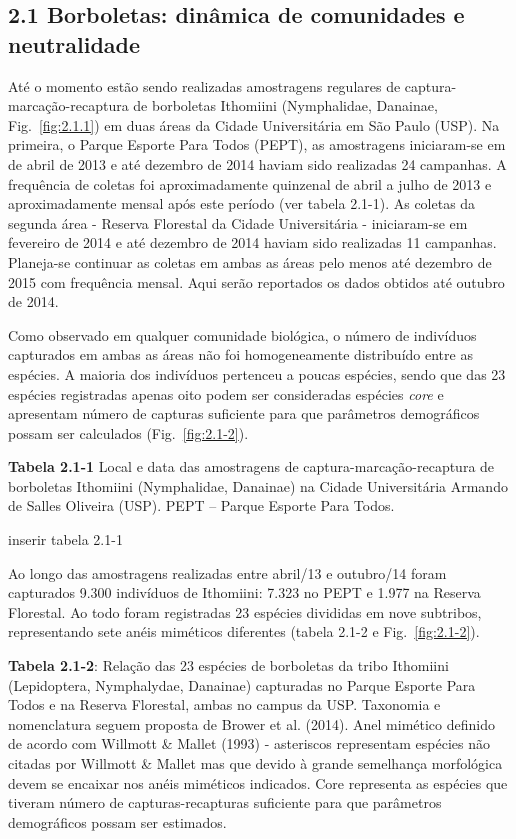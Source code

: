 \subsection{2.1 Borboletas: dinâmica de comunidades e neutralidade} %
\label{sec:dinamica-temporal-borb} 
Até o momento estão sendo realizadas amostragens regulares de
captura-marcação-recaptura de borboletas Ithomiini (Nymphalidae,
Danainae, Fig.~\ref{fig:2.1.1}) 
em duas áreas da Cidade Universitária em São Paulo (USP). Na
primeira, o Parque Esporte Para Todos (PEPT), as amostragens
iniciaram-se em de abril de 2013 e até dezembro de 2014 haviam sido
realizadas 24 campanhas. A frequência de coletas foi aproximadamente
quinzenal de abril a julho de 2013 e aproximadamente mensal após este
período (ver tabela 2.1-1). As coletas da segunda área - Reserva
Florestal da Cidade Universitária - iniciaram-se em fevereiro de 2014
e até dezembro de 2014 haviam sido realizadas 11 campanhas. Planeja-se
continuar as coletas em ambas as áreas pelo menos até dezembro de 2015
com frequência mensal. Aqui serão reportados os dados obtidos até
outubro de 2014.

Como observado em qualquer comunidade biológica, o número de
indivíduos capturados em ambas as áreas não foi homogeneamente
distribuído entre as espécies. A maioria dos indivíduos pertenceu a
poucas espécies, sendo que das 23 espécies registradas apenas oito
podem ser consideradas espécies \emph{core} e apresentam número de capturas
suficiente para que parâmetros demográficos possam ser calculados
(Fig.~\ref{fig:2.1-2}). 

\textbf{Tabela 2.1-1} Local e data das amostragens de
captura-marcação-recaptura de borboletas Ithomiini (Nymphalidae,
Danainae) na Cidade Universitária Armando de Salles Oliveira
(USP). PEPT – Parque Esporte Para Todos.

inserir tabela 2.1-1



Ao longo das amostragens realizadas entre abril/13 e outubro/14 foram
capturados 9.300 indivíduos de Ithomiini: 7.323 no PEPT e 1.977 na
Reserva Florestal. Ao todo foram registradas 23 espécies divididas em
nove subtribos, representando sete anéis miméticos diferentes (tabela
2.1-2 e Fig.~\ref{fig:2.1-2}).

\textbf{Tabela 2.1-2}: Relação das 23 espécies de borboletas da tribo
Ithomiini (Lepidoptera, Nymphalydae, Danainae) capturadas no Parque
Esporte Para Todos e na Reserva Florestal, ambas no campus da
USP. Taxonomia e nomenclatura seguem proposta de Brower et
al. (2014). Anel mimético definido de acordo com Willmott \& Mallet
(1993) - asteriscos representam espécies não citadas por Willmott \&
Mallet mas que devido à grande semelhança morfológica devem se
encaixar nos anéis miméticos indicados. Core representa as espécies
que tiveram número de capturas-recapturas suficiente para que
parâmetros demográficos possam ser estimados.